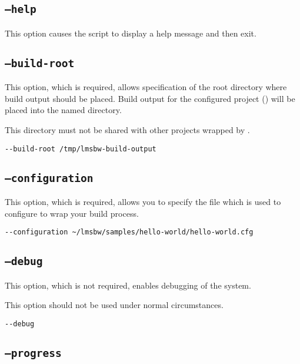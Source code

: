 \subsection{\texttt{--help}}

This option causes the script to display a help message and then exit.

\subsection{\texttt{--build-root}}

This option, which is required, allows specification of the root
directory where build output should be placed.  Build output for the
configured project () will be placed into
the named directory.

This directory must not be shared with other projects wrapped by
\lmsbw.

\begin{verbatim}
--build-root /tmp/lmsbw-build-output
\end{verbatim}

\subsection{\texttt{--configuration}}\label{lmsbw:configuration}

This option, which is required, allows you to specify the file which
is used to configure \lmsbw to wrap your build process.

\begin{verbatim}
--configuration ~/lmsbw/samples/hello-world/hello-world.cfg
\end{verbatim}


\subsection{\texttt{--debug}}

This option, which is not required, enables debugging of the \lmsbw
system.

This option should not be used under normal circumstances.

\begin{verbatim}
--debug
\end{verbatim}

\subsection{\texttt{--progress}}

